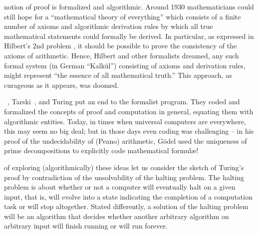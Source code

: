  notion of proof is formalized and algorithmic.
Around 1930 mathematicians could still hope for a
``mathematical theory of everything''
which consists of a finite number of axioms and algorithmic derivation rules
by which all true mathematical statements could formally be derived.
In particular, as expressed in Hilbert's 2nd problem \citep{hilbert-1900e},
it should be possible to prove the consistency of the axioms of arithmetic.
Hence, Hilbert and other formalists dreamed, any such formal system (in German
``Kalk\"ul'') consisting of axioms and derivation rules, might
represent ``the essence of all mathematical truth.''
This approach, as curageous as it appears, was doomed.

~\cite{godel1}, Tarski~\cite{tarski:32}, and Turing
\cite{turing-36} put an end to the formalist program.
They coded and  formalized the concepts of proof and computation in general,
equating them with algorithmic entities.
Today, in times when universal computers are everywhere, this may seem no big deal;
but in those days even coding was challenging -- in his proof
of the undecidability of (Peano) arithmetic,
G\"odel used the uniqueness of prime decompositions to explicitly code mathematical formul\ae!

 of exploring (algorithmically) these ideas
let us consider the sketch of Turing's proof by contradiction
of the unsolvability of the halting problem.
The halting problem is about whether or not a computer will eventually halt on a given input,
that is, will evolve into a state indicating the completion of a computation task or will stop altogether.
Stated differently, a solution of the halting problem will be an algorithm that
decides whether another arbitrary algorithm on arbitrary input will finish running or will run forever.

